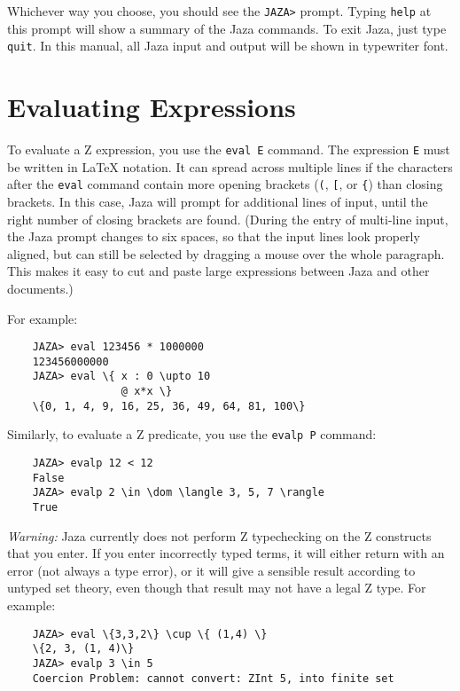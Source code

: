 \documentclass[11pt]{article}
\newcommand{\Jaza}{Jaza}
\newcommand{\jazainput}[1]{{\ttfamily\itshape #1}}
\begin{document}
Whichever way you choose, you should see the \verb!JAZA>! prompt.
Typing \verb!help! at this prompt will show a summary of the
{\Jaza} commands.  To exit {\Jaza}, just type \verb!quit!.
In this manual, all Jaza input and output will
be shown in typewriter font.

\section{Evaluating Expressions}
\label{sec:expr}

To evaluate a Z expression, you use the \verb!eval E! command.
The expression \verb!E! must be written in LaTeX notation.
It can spread across multiple lines if the characters after the \verb!eval! 
command contain more opening brackets (\verb!(!, \verb![!, or \verb!{!)
than closing brackets.  In this case, {\Jaza} will prompt for additional
lines of input, until the right number of closing brackets are found.
(During the entry of multi-line input, the {\Jaza} prompt changes to
six spaces, so that the input lines look properly aligned,
but can still be selected by dragging a mouse over the whole
paragraph.  This makes it easy to cut and paste large expressions
between {\Jaza} and other documents.)

For example:
\begin{verbatim}
    JAZA> eval 123456 * 1000000
    123456000000
    JAZA> eval \{ x : 0 \upto 10 
                  @ x*x \}
    \{0, 1, 4, 9, 16, 25, 36, 49, 64, 81, 100\}
\end{verbatim}

Similarly, to evaluate a Z predicate, you use the 
\verb!evalp P! command:
\begin{verbatim}
    JAZA> evalp 12 < 12
    False
    JAZA> evalp 2 \in \dom \langle 3, 5, 7 \rangle
    True
\end{verbatim}


\emph{Warning:} {\Jaza} currently does not perform Z 
typechecking on the Z constructs that you enter.  
If you enter incorrectly typed terms, it will either return 
with an error (not always a type error), or it will give a 
sensible result according to untyped set theory,
even though that result may not have a legal Z type.
For example:
\begin{verbatim}
    JAZA> eval \{3,3,2\} \cup \{ (1,4) \}
    \{2, 3, (1, 4)\}
    JAZA> evalp 3 \in 5
    Coercion Problem: cannot convert: ZInt 5, into finite set
\end{verbatim}
\end{document}
